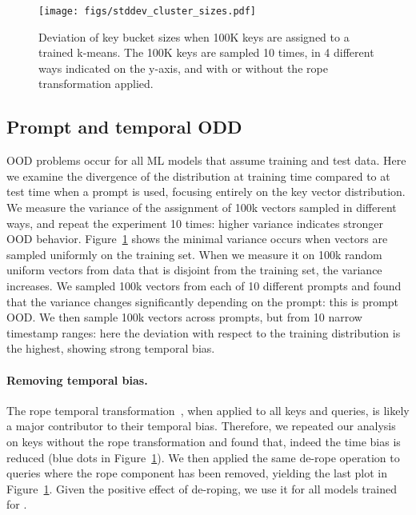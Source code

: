 \begin{figure}
%
    \centering
    \texttt{[image: figs/stddev\_cluster\_sizes.pdf]}
%
    \vspace{-1.5em}
    \caption{
Deviation of key bucket sizes when 100K keys are assigned to a trained k-means.
The 100K keys are sampled 10 times, in 4 different ways indicated on the y-axis, and with or without the rope transformation applied.
%
    \label{fig:otherOOD}}
\end{figure}

\subsection{Prompt and temporal ODD}
\label{sec:otherOOD}

OOD problems occur for all ML models that assume \iid training and test data. 
Here we examine the divergence of the distribution at training time compared to at test time when a prompt is used, focusing entirely on the key vector distribution.
We measure the variance of the assignment of 100k vectors sampled in different ways, and repeat the experiment 10 times: higher variance indicates stronger OOD behavior.
Figure~\ref{fig:otherOOD} shows the minimal variance occurs when vectors are sampled uniformly on the training set. 
When we measure it on 100k random uniform vectors from data that is disjoint from the training set, the variance increases.
We sampled 100k vectors from each of 10 different prompts and found that the variance changes significantly depending on the prompt: this is prompt OOD. %
We then sample 100k vectors across prompts, but from 10 narrow timestamp ranges: here the deviation with respect to the training distribution is the highest, showing strong temporal bias.

\paragraph{Removing temporal bias.}
\label{sec:derope}
The rope temporal transformation~\citep{su2023roformerenhancedtransformerrotary}, when applied to all keys and queries, is likely a major contributor to their temporal bias. 
Therefore, we repeated our analysis on keys without the rope transformation and found that, indeed the time bias is reduced (blue dots in Figure~\ref{fig:otherOOD}). 
We then applied the same de-rope operation to queries where the rope component has been removed, yielding the last plot in Figure~\ref{fig:otherOOD}.
Given the positive effect of de-roping, we use it for all models trained for \OURS.


